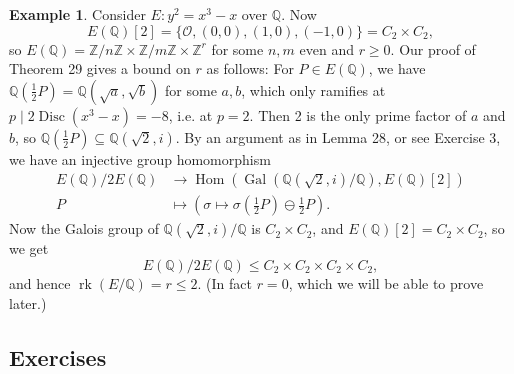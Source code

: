 \documentclass[a4paper]{article}
\theoremstyle{definition}
\newtheorem*{example}{Example}
\DeclareMathOperator{\Hom}{Hom}
\DeclareMathOperator{\Disc}{Disc}
\DeclareMathOperator{\Gal}{Gal}
\DeclareMathOperator{\rk}{rk}
\renewcommand{\O}{\mathcal{O}}
\newcommand{\Z}{\mathbb{Z}}
\newcommand{\Q}{\mathbb{Q}}
\begin{document}
\begin{example}
    Consider $E:y^2=x^3-x$ over $\Q$. Now
    \begin{equation*}
        E(\Q)[2]=\{\O,(0,0),(1,0),(-1,0)\}=C_2\times C_2,
    \end{equation*}
    so $E(\Q)=\Z/n\Z\times\Z/m\Z\times\Z^r$ for some $n,m$ even and $r\ge0$.
    Our proof of Theorem 29 gives a bound on $r$ as follows: For $P\in E(\Q)$,
    we have $\Q(\frac{1}{2}P)=\Q(\sqrt a,\sqrt b)$ for some $a,b$, which only
    ramifies at $p\mid 2\Disc(x^3-x)=-8$, i.e. at $p=2$. Then 2 is the only
    prime factor of $a$ and $b$, so $\Q(\frac{1}{2}P)\subseteq\Q(\sqrt2,i)$. By
    an argument as in Lemma 28, or see Exercise 3, we have an injective group
    homomorphism
    \begin{align*}
        E(\Q)/2E(\Q) &\to \Hom(\Gal(\Q(\sqrt2,i)/\Q),E(\Q)[2]) \\
        P &\mapsto (\sigma\mapsto
            \sigma({\textstyle\frac{1}{2}P})\ominus{\textstyle\frac{1}{2}P}).
    \end{align*}
    Now the Galois group of $\Q(\sqrt2,i)/\Q$ is $C_2\times C_2$, and
    $E(\Q)[2]=C_2\times C_2$, so we get
    \begin{equation*}
        E(\Q)/2E(\Q) \le C_2\times C_2\times C_2\times C_2,
    \end{equation*}
    and hence $\rk(E/\Q)=r\le2$. (In fact $r=0$, which we will be able to prove
    later.)
\end{example}

\subsection*{Exercises}
\end{document}
